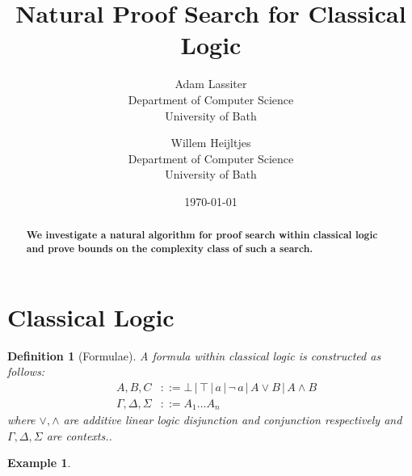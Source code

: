\documentclass{article}
\title{Natural Proof Search for Classical Logic}
\author{Adam Lassiter\\Department of Computer Science\\University of Bath \and Willem Heijltjes\\Department of Computer Science\\University of Bath}
\date{\today}
\def\defeq{::=}
\theoremstyle{indented}
\newtheorem{definition}[sec-ctr]{Definition}
\newtheorem*{example*}{Example}
\begin{document}
    \maketitle
    \begin{abstract}
        \textbf{We investigate a natural algorithm for proof search within classical logic and prove bounds on the complexity class of such a search.}
    \end{abstract}




    \section{Classical Logic}

        \begin{definition}[Formulae]
            A \textit{formula} within classical logic is constructed as follows:
            \begin{align*}
                \quad A, B, C                &\defeq \bot \,|\, \top \,|\, a \,|\, \neg\, a \,|\, A \vee B \,|\, A \wedge B \\
                \quad \Gamma, \Delta, \Sigma &\defeq A_1 \ldots A_n
            \end{align*}
            where $\vee, \wedge$ are additive linear logic disjunction and conjunction respectively and $\Gamma, \Delta, \Sigma$ are contexts..
        \end{definition}

        \begin{example*}
        \end{example*}
\end{document}
